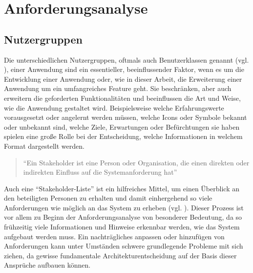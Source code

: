 \chapter{Anforderungsanalyse}
\label{anforderungsanalyse}
\minitoc\pagebreak
\section{Nutzergruppen}
Die unterschiedlichen Nutzergruppen, oftmals auch Benutzerklassen genannt (vgl. \cite[S. 125]{Herczeg.2018}), einer Anwendung sind ein essentieller, beeinflussender Faktor, wenn es um die Entwicklung einer Anwendung oder, wie in dieser Arbeit, die Erweiterung einer Anwendung um ein umfangreiches Feature geht. Sie beschränken, aber auch erweitern die geforderten Funktionalitäten und beeinflussen die Art und Weise, wie die Anwendung gestaltet wird. Beispielsweise welche Erfahrungswerte vorausgesetzt oder angelernt werden müssen, welche Icons oder Symbole bekannt oder unbekannt sind, welche Ziele, Erwartungen oder Befürchtungen sie haben spielen eine große Rolle bei der Entscheidung, welche Informationen in welchem Format dargestellt werden.

\begin{quote}
"`Ein Stakeholder ist eine Person oder Organisation, die einen direkten oder indirekten Einfluss auf die Systemanforderung hat"' \cite{Pohl.2011} 
\end{quote}
Auch eine "`Stakeholder-Liste"' ist ein hilfreiches Mittel, um einen Überblick an den beteiligten Personen zu erhalten und damit einhergehend so viele Anforderungen wie möglich an das System zu erheben (vgl. \cite[S. 83]{Bergsmann.2018}). Dieser Prozess ist vor allem zu Beginn der Anforderungsanalyse von besonderer Bedeutung, da so frühzeitig viele Informationen und Hinweise erkennbar werden, wie das System aufgebaut werden muss. Ein nachträgliches anpassen oder hinzufügen von Anforderungen kann unter Umständen schwere grundlegende Probleme mit sich ziehen, da gewisse fundamentale Architekturentscheidung auf der Basis dieser Ansprüche aufbauen können.

